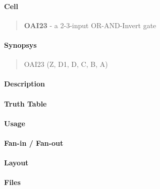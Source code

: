 \label{OAI23}
\paragraph{Cell}
\begin{quote}
    \textbf{OAI23} - a 2-3-input OR-AND-Invert gate
\end{quote}

\paragraph{Synopsys}
\begin{quote}
    OAI23 (Z, D1, D, C, B, A)
\end{quote}

\paragraph{Description}

%

\paragraph{Truth Table}
%

\paragraph{Usage}

\paragraph{Fan-in / Fan-out}

\paragraph{Layout}

\paragraph{Files}
